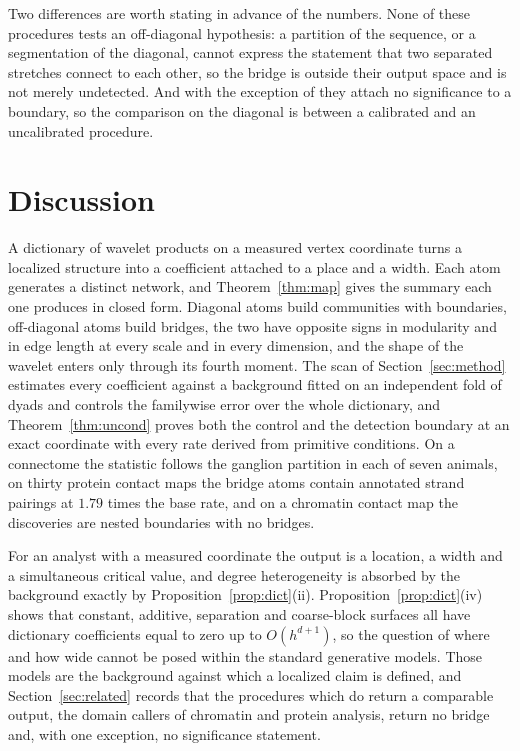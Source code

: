 \documentclass[11pt]{article}
\theoremstyle{definition}
\newcommand{\1}{\mathbf 1}\newcommand{\op}{\operatorname}
\begin{document}
Two differences are worth stating in advance of the numbers.  None of these
procedures tests an off-diagonal hypothesis: a partition of the sequence, or a
segmentation of the diagonal, cannot express the statement that two separated
stretches connect to each other, so the bridge is outside their output space
and is not merely undetected.  And with the exception of \citet{xing2021}
they attach no significance to a boundary, so the comparison on the diagonal
is between a calibrated and an uncalibrated procedure.



\section{Discussion}                                        \label{sec:discussion}

A dictionary of wavelet products on a measured vertex coordinate turns a
localized structure into a coefficient attached to a place and a width.  Each
atom generates a distinct network, and Theorem~\ref{thm:map} gives the
summary each one produces in closed form.  Diagonal atoms build communities
with boundaries, off-diagonal atoms build bridges, the two have opposite signs
in modularity and in edge length at every scale and in every dimension, and
the shape of the wavelet enters only through its fourth moment.  The scan of
Section~\ref{sec:method} estimates every coefficient against a background
fitted on an independent fold of dyads and controls the familywise error over
the whole dictionary, and Theorem~\ref{thm:uncond} proves both the control and
the detection boundary at an exact coordinate with every rate derived from
primitive conditions.  On a connectome the statistic follows the ganglion
partition in each of seven animals, on thirty protein contact maps the bridge
atoms contain annotated strand pairings at $1.79$ times the base rate, and on a chromatin contact map the
discoveries are nested boundaries with no bridges.

For an analyst with a measured coordinate the output is a location, a width
and a simultaneous critical value, and degree heterogeneity is absorbed by the
background exactly by Proposition~\ref{prop:dict}(ii).
Proposition~\ref{prop:dict}(iv) shows that constant, additive, separation and
coarse-block surfaces all have dictionary coefficients equal to zero up to
$O(h^{d+1})$, so the question of where and how wide cannot be posed within the
standard generative models.  Those models are the background against which a
localized claim is defined, and Section~\ref{sec:related} records that the
procedures which do return a comparable output, the domain callers of
chromatin and protein analysis, return no bridge and, with one exception, no
significance statement.
\end{document}
